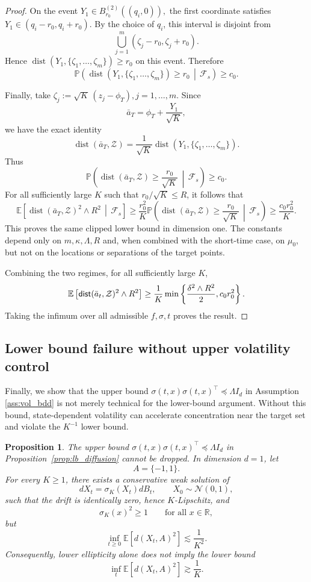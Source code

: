 \documentclass{article}
\newtheorem{prop}[thm]{Proposition}
\newcommand{\1}{\mathbbm{1}}
\newcommand{\dist}{{\sf dist}}
\newcommand{\E}{\mathbb E}
\renewcommand{\H}{\mathcal{H}}
\numberwithin{equation}{section}
\def\E{{\bf E}} \def\H{{\bf H}} \def\J{{\bf J}}
\def\E{\mathbb{E}}
\begin{document}
\begin{proof}
On the event
$
\widehat Y_1\in B_{r_0}^{(2)}((q_i,0)),
$
the first coordinate satisfies
$
Y_1\in(q_i-r_0,q_i+r_0).
$
By the choice of $q_i$, this interval is disjoint from
\[
\bigcup_{j=1}^m(\zeta_j-r_0,\zeta_j+r_0).
\]
Hence
$
\operatorname{dist}(Y_1,\{\zeta_1,\ldots,\zeta_m\})\ge r_0
$
on this event. Therefore
\[
\mathbb P\!\left(
\operatorname{dist}(Y_1,\{\zeta_1,\ldots,\zeta_m\})\ge r_0
\,\middle|\,\mathcal F_s
\right)
\ge c_0 .
\]

Finally, take
$
\zeta_j:=\sqrt K\,(z_j-\phi_T), j=1,\ldots,m.
$
Since
\[
\bar a_T=\phi_T+\frac{Y_1}{\sqrt K},
\]
we have the exact identity
\[
\operatorname{dist}(\bar a_T,\mathcal{Z})
=
\frac{1}{\sqrt K}
\operatorname{dist}(Y_1,\{\zeta_1,\ldots,\zeta_m\}).
\]
Thus
\[
\mathbb P\!\left(
\operatorname{dist}(\bar a_T, \mathcal{Z})\ge \frac{r_0}{\sqrt K}
\,\middle|\,\mathcal F_s
\right)
\ge c_0 .
\]
For all sufficiently large $K$ such that $r_0/\sqrt K\le R$, it follows that
\[
\mathbb E\!\left[
\operatorname{dist}(\bar a_T, \mathcal{Z})^2\wedge R^2
\,\middle|\,\mathcal F_s
\right]
\ge
\frac{r_0^2}{K}
\mathbb P\!\left(
\operatorname{dist}(\bar a_T,\mathcal{Z})\ge \frac{r_0}{\sqrt K}
\,\middle|\,\mathcal F_s
\right)
\ge
\frac{c_0r_0^2}{K}.
\]
This proves the same clipped lower bound in dimension one. The constants
depend only on $m,\kappa,\Lambda,R$ and, when combined with the short-time
case, on $\mu_0$, but not on the locations or separations of the target
points.

Combining the two regimes, for all sufficiently large $K$,
$$
\mathbb E\left[\dist(\bar a_t, \mathcal{Z})^2\wedge R^2\right]
\ge
\frac{1}{K}
\min\left\{
\frac{\delta^2\wedge R^2}{2},
c_0r_0^2
\right\}.
$$
Taking the infimum over all admissible $f,\sigma,t$ proves the result.
\end{proof}


\subsection{Lower bound failure without upper volatility control}

Finally, we show that the upper bound $\sigma(t,x)\sigma(t,x)^\top \preceq \Lambda I_d$ in Assumption \ref{ass:vol_bdd} is not merely technical for the lower-bound argument. Without this bound, state-dependent volatility can accelerate concentration near the target set and violate the \(K^{-1}\) lower bound.




\begin{prop}
\label{prop:unbounded_sigma_counterexample}
The upper bound $\sigma(t,x)\sigma(t,x)^\top\preceq \Lambda I_d$ in Proposition~\ref{prop:lb_diffusion} cannot be dropped. In dimension $d=1$, let
$$
A=\{-1,1\}.
$$
For every $K\ge 1$, there exists a conservative weak solution of
$$
dX_t=\sigma_K(X_t)dB_t,
\qquad
X_0\sim \mathcal N(0,1),
$$
such that the drift is identically zero, hence $K$-Lipschitz, and
$$
\sigma_K(x)^2\ge 1
\qquad
\text{for all }x\in\mathbb R,
$$
but
$$
\inf_{t\ge 0}\E[d(X_t,A)^2]\lesssim \frac{1}{K^2}.
$$
Consequently, lower ellipticity alone does not imply the lower bound
$$
\inf_t \E[d(X_t,A)^2]\gtrsim \frac1K.
$$
\end{prop}
\end{document}
